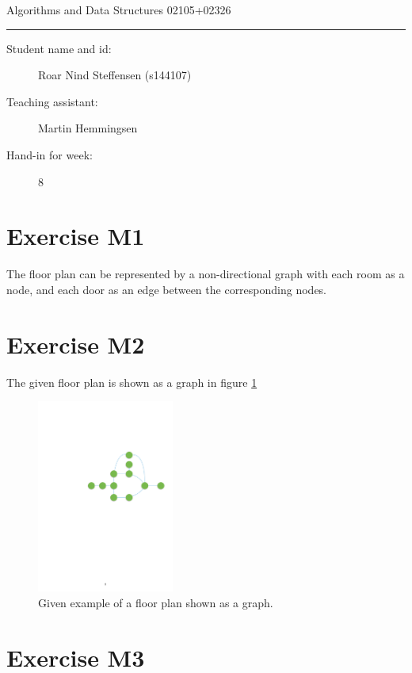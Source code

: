 \documentclass[10pt]{article}
\begin{document}
\begin{center}
{{\Large \sc Algorithms and Data Structures 02105+02326}}
\end{center}
\rule{\textwidth}{1pt}
\begin{description}
\item[Student name and id:] Roar Nind Steffensen (s144107)
\item[Teaching assistant:] Martin Hemmingsen
\item[Hand-in for week:] 8
\end{description}

\section*{Exercise M1}

The floor plan can be represented by a non-directional graph with each room as a node, and each door as an edge between the corresponding nodes.

\section*{Exercise M2}

The given floor plan is shown as a graph in figure \ref{fig:floorplan}

\begin{figure}[H]
    \centering
    \includegraphics[width=0.4\textwidth]{floorplan}
    \caption{Given example of a floor plan shown as a graph.}
    \label{fig:floorplan}
\end{figure}

\section*{Exercise M3}
\end{document}
